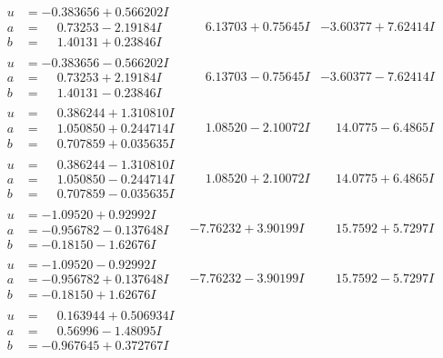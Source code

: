 \documentclass[1p]{elsarticle_modified}
\theoremstyle{definition}
\begin{document}
$$\begin{array}{c|c|c}
\begin{aligned}
u &= -0.383656 + 0.566202 I \\
a &= \phantom{-}0.73253 - 2.19184 I \\
b &= \phantom{-}1.40131 + 0.23846 I\end{aligned}
 & \phantom{-}6.13703 + 0.75645 I & -3.60377 + 7.62414 I \\ \hline\begin{aligned}
u &= -0.383656 - 0.566202 I \\
a &= \phantom{-}0.73253 + 2.19184 I \\
b &= \phantom{-}1.40131 - 0.23846 I\end{aligned}
 & \phantom{-}6.13703 - 0.75645 I & -3.60377 - 7.62414 I \\ \hline\begin{aligned}
u &= \phantom{-}0.386244 + 1.310810 I \\
a &= \phantom{-}1.050850 + 0.244714 I \\
b &= \phantom{-}0.707859 + 0.035635 I\end{aligned}
 & \phantom{-}1.08520 - 2.10072 I & \phantom{-}14.0775 - 6.4865 I \\ \hline\begin{aligned}
u &= \phantom{-}0.386244 - 1.310810 I \\
a &= \phantom{-}1.050850 - 0.244714 I \\
b &= \phantom{-}0.707859 - 0.035635 I\end{aligned}
 & \phantom{-}1.08520 + 2.10072 I & \phantom{-}14.0775 + 6.4865 I \\ \hline\begin{aligned}
u &= -1.09520 + 0.92992 I \\
a &= -0.956782 - 0.137648 I \\
b &= -0.18150 - 1.62676 I\end{aligned}
 & -7.76232 + 3.90199 I & \phantom{-}15.7592 + 5.7297 I \\ \hline\begin{aligned}
u &= -1.09520 - 0.92992 I \\
a &= -0.956782 + 0.137648 I \\
b &= -0.18150 + 1.62676 I\end{aligned}
 & -7.76232 - 3.90199 I & \phantom{-}15.7592 - 5.7297 I \\ \hline\begin{aligned}
u &= \phantom{-}0.163944 + 0.506934 I \\
a &= \phantom{-}0.56996 - 1.48095 I \\
b &= -0.967645 + 0.372767 I\end{aligned}

\end{array}$$
\end{document}
